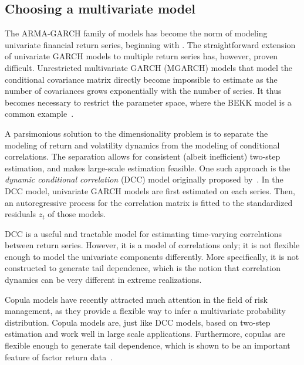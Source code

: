 
\subsection{Choosing a multivariate model}
\label{sub:05_01_choosing}
The ARMA-GARCH family of models has become the norm of modeling univariate financial return series, beginning with \textcite{Bollerslev1986}. The straightforward extension of univariate GARCH models to multiple return series has, however, proven difficult. Unrestricted multivariate GARCH (MGARCH) models that model the conditional covariance matrix directly become impossible to estimate as the number of covariances grows exponentially with the number of series. It thus becomes necessary to restrict the parameter space, where the BEKK model is a common example~\autocite{BEKKModel}.

A parsimonious solution to the dimensionality problem is to separate the modeling of return and volatility dynamics from the modeling of conditional correlations. The separation allows for consistent (albeit inefficient) two-step estimation, and makes large-scale estimation feasible. One such approach is the \emph{dynamic conditional correlation} (DCC) model originally proposed by~\autocite{Engle2002}. In the DCC model, univariate GARCH models are first estimated on each series. Then, an autoregressive process for the correlation matrix is fitted to the standardized residuals ${z_t}$ of those models. 

DCC is a useful and tractable model for estimating time-varying correlations between return series. However, it is a model of correlations only; it is not flexible enough to model the univariate components differently. More specifically, it is not constructed to generate tail dependence, which is the notion that correlation dynamics can be very different in extreme realizations. 

Copula models have recently attracted much attention in the field of risk management, as they provide a flexible way to infer a multivariate probability distribution. Copula models are, just like DCC models, based on two-step estimation and work well in large scale applications. Furthermore, copulas are flexible enough to generate tail dependence, which is shown to be an important feature of factor return data~\autocite{ChristoffersenLanglois2013}. 

